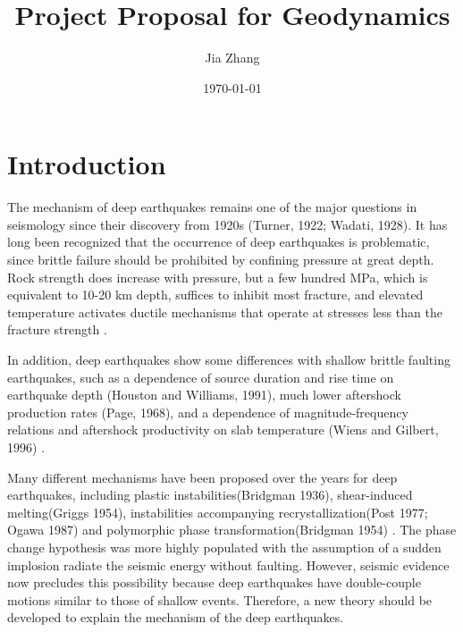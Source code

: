 \documentclass[12pt]{article}
\begin{document}

\title{Project Proposal for Geodynamics}
\author{Jia Zhang}
\date{\today}



\maketitle


\section{Introduction}


The mechanism of deep earthquakes remains one of the major questions in
seismology since their discovery from 1920s (Turner, 1922; Wadati, 1928).
It has long been recognized that the occurrence of deep earthquakes
is problematic, since brittle failure should be prohibited by confining pressure
at great depth. Rock strength does increase with pressure, but a few hundred MPa,
which is equivalent to 10-20 km depth, suffices to inhibit most fracture, and
elevated temperature activates ductile mechanisms that operate at stresses less
than the fracture strength
\cite{green1989}.

In addition, deep earthquakes show some differences with shallow brittle faulting earthquakes,
such as a dependence of source duration and rise time on earthquake depth (Houston and Williams, 1991),
much lower aftershock production rates (Page, 1968), and a dependence of magnitude-frequency
relations and aftershock productivity on slab temperature (Wiens and Gilbert, 1996)
\cite{wiens2001}.

Many different mechanisms have been proposed over the years for deep earthquakes, including plastic instabilities(Bridgman 1936), shear-induced melting(Griggs 1954), instabilities accompanying
recrystallization(Post 1977; Ogawa 1987) and polymorphic phase transformation(Bridgman 1954)
\cite{green1995}.
The phase change hypothesis was more highly populated with the assumption of a sudden implosion radiate the seismic energy without faulting. However, seismic evidence now precludes this possibility because deep earthquakes have double-couple motions similar to those of shallow events. Therefore, a new theory should be developed to explain the mechanism of the deep earthquakes.
\end{document}
